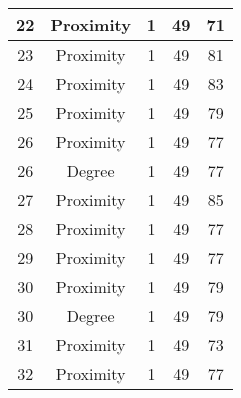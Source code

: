 \documentclass[results.tex]{subfiles}
\begin{document}
\begin{center}
\begin{tabular}{| c || c | c | c | c |}
            \hline
            22                      & Proximity                    & 1                      & 49                      & 71                   \\
            \hline
            23                      & Proximity                    & 1                      & 49                      & 81                   \\
            \hline
            24                      & Proximity                    & 1                      & 49                      & 83                   \\
            \hline
            25                      & Proximity                    & 1                      & 49                      & 79                   \\
            \hline
            26                      & Proximity                    & 1                      & 49                      & 77                   \\
            \hline
            26                      & Degree                       & 1                      & 49                      & 77                   \\
            \hline
            27                      & Proximity                    & 1                      & 49                      & 85                   \\
            \hline
            28                      & Proximity                    & 1                      & 49                      & 77                   \\
            \hline
            29                      & Proximity                    & 1                      & 49                      & 77                   \\
            \hline
            30                      & Proximity                    & 1                      & 49                      & 79                   \\
            \hline
            30                      & Degree                       & 1                      & 49                      & 79                   \\
            \hline
            31                      & Proximity                    & 1                      & 49                      & 73                   \\
            \hline
            32                      & Proximity                    & 1                      & 49                      & 77                   \\

\end{tabular}
\end{center}
\end{document}
